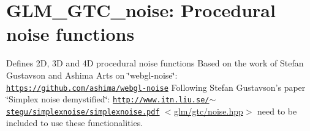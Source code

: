 \hypertarget{group__gtc__noise}{\section{\-G\-L\-M\-\_\-\-G\-T\-C\-\_\-noise\-: \-Procedural noise functions}
\label{group__gtc__noise}
}
\-Defines 2\-D, 3\-D and 4\-D procedural noise functions \-Based on the work of \-Stefan \-Gustavson and \-Ashima \-Arts on \char`\"{}webgl-\/noise\char`\"{}\-: \href{https://github.com/ashima/webgl-noise}{\tt https\-://github.\-com/ashima/webgl-\/noise} \-Following \-Stefan \-Gustavson's paper \char`\"{}\-Simplex noise demystified\char`\"{}\-: \href{http://www.itn.liu.se/~stegu/simplexnoise/simplexnoise.pdf}{\tt http\-://www.\-itn.\-liu.\-se/$\sim$stegu/simplexnoise/simplexnoise.\-pdf} $<$\hyperlink{gtc_2noise_8hpp}{glm/gtc/noise.\-hpp}$>$ need to be included to use these functionalities. 